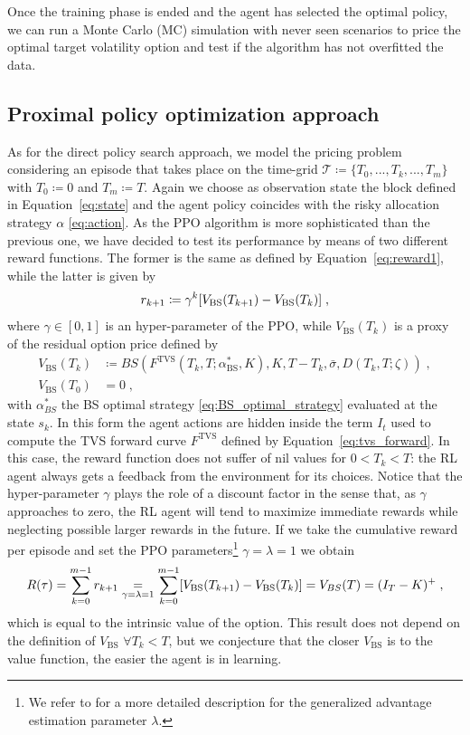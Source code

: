 \documentclass[runningheads]{m2ef}
\begin{document}
	Once the training phase is ended and the agent has selected the optimal policy, we can run a Monte Carlo (MC) simulation with never seen scenarios to price the optimal target volatility option and test if the algorithm has not overfitted the data.


	\subsection{Proximal policy optimization approach}
	As for the direct policy search approach, we model the pricing problem considering an episode that takes place on the time-grid $\mathcal{T}\coloneqq \{T_0,...,T_k,...,T_m\}$ with $T_0\coloneqq 0$ and $T_m \coloneqq T$. Again we choose as observation state the block defined in Equation~\eqref{eq:state} and the agent policy coincides with the risky allocation strategy $\alpha$ \eqref{eq:action}. 
	As the PPO algorithm is more sophisticated than the previous one, we have decided to test its performance by means of two different reward functions. The former is the same as defined by Equation~\eqref{eq:reward1}, while the latter is given by
	\begin{equation}
		r_{k+1} \coloneqq  \gamma^{k}[V_{\text{BS}}(T_{k+1})-V_\text{\text{BS}}(T_k)] \; ,
	\label{eq:reward2}\end{equation}
	where $\gamma \in[0,1]$ is an hyper-parameter of the PPO, while $V_{\text{BS}}(T_k)$ is a proxy of the residual option price defined by
	\begin{equation}
	\begin{aligned}
		V_{\text{BS}}(T_k) &\coloneqq BS(F^{\text{TVS}}(T_k,T;\alpha^*_{\text{BS}},K),K,T-T_k,\bar{\sigma},D(T_k,T;\zeta)) \; ,\\
		V_{\text{BS}}(T_0)&=0 \; , 
	\end{aligned}
	\end{equation} 
	with $\alpha^*_{BS}$ the BS optimal strategy \eqref{eq:BS_optimal_strategy} evaluated at the state $s_k$. In this form the agent actions are hidden inside the term $I_t$ used to compute the TVS forward curve $F^{\text{TVS}}$ defined by Equation~\eqref{eq:tvs_forward}. In this case, the reward function does not suffer of nil values for $0<T_k<T$: the RL agent always gets a feedback from the environment for its choices.  Notice that the hyper-parameter $\gamma$ plays the role of a discount factor in the sense that, as $\gamma$ approaches to zero, the RL agent will tend to maximize immediate rewards while neglecting possible larger rewards in the future.
	If we take the cumulative reward per episode and set the PPO parameters\footnote{We refer to \cite{Schulman2016} for a more detailed description for the generalized advantage estimation parameter $\lambda$.} $\gamma =\lambda =1$ we obtain
	\begin{equation}
		R(\tau) = \sum_{k=0}^{m-1} r_{k+1} \underset{\gamma=\lambda =1}{=} \sum_{k=0}^{m-1}[V_{\text{BS}}(T_{k+1})-V_\text{\text{BS}}(T_k)] = V_{BS}(T) = (I_T-K)^+ \; ,
	\end{equation} 
	which is equal to the intrinsic value of the option. This result does not depend on the definition of $V_{\text{BS}}$  $\forall T_k<T$, but we conjecture that the closer $V_{\text{BS}}$ is to the value function, the easier the agent is in learning.
\end{document}
